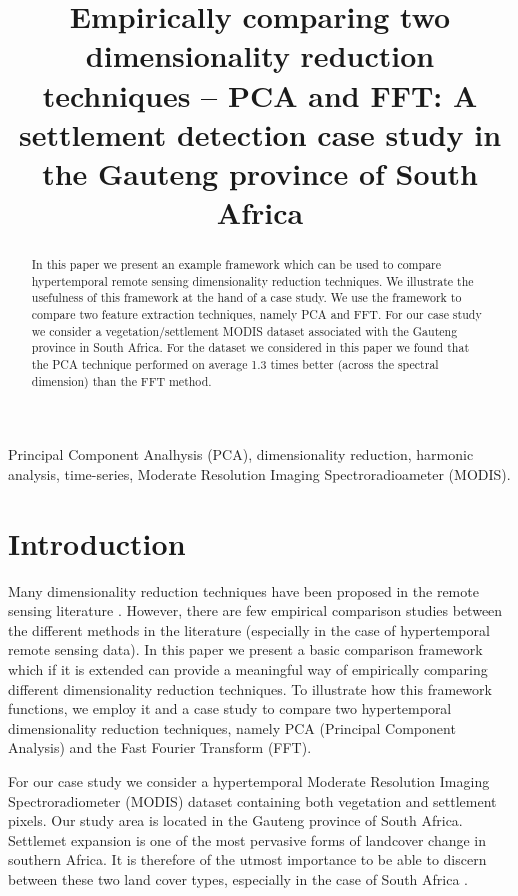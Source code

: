 \documentclass{article}
\title{Empirically comparing two dimensionality reduction techniques -- PCA and FFT: A settlement detection case study in the Gauteng province of South Africa}
\begin{document}
%
\maketitle
%
\begin{abstract}
In this paper we present an example framework which can be used to compare hypertemporal remote sensing dimensionality reduction techniques. 
We illustrate the usefulness of this framework at the hand of a case study. We use the framework to compare two 
feature extraction techniques, namely PCA and FFT. For our case study we consider a vegetation/settlement MODIS dataset associated with the Gauteng province in South Africa. 
For the dataset we considered in this paper we found that the PCA technique performed on average 1.3 times better (across the spectral dimension) than the FFT method.
\end{abstract}
%
\begin{keywords}
Principal Component Analhysis (PCA), dimensionality reduction, harmonic analysis, time-series, Moderate Resolution Imaging Spectroradioameter (MODIS).
\end{keywords}
%

\section{Introduction}
\label{sec:intro}

Many dimensionality reduction techniques have been proposed in the remote sensing literature \cite{grobler2012}. However, there are few empirical comparison studies between the different methods
in the literature (especially in the case of hypertemporal remote sensing data). In this paper we present a basic comparison framework which if it is extended can provide 
a meaningful way of empirically comparing different dimensionality reduction techniques. To illustrate how this framework functions, we employ it and a case study to compare two hypertemporal 
dimensionality reduction techniques, namely PCA (Principal Component Analysis) and the Fast Fourier Transform (FFT).

For our case study we consider a hypertemporal Moderate Resolution Imaging Spectroradiometer (MODIS) dataset containing both vegetation and settlement pixels. Our study area is located in the Gauteng province of South Africa. Settlemet expansion is one of the most pervasive forms of landcover change in southern Africa. It is therefore of the utmost importance to be able to discern 
between these two land cover types, especially in the case of South Africa \cite{grobler2012}. 
\end{document}
